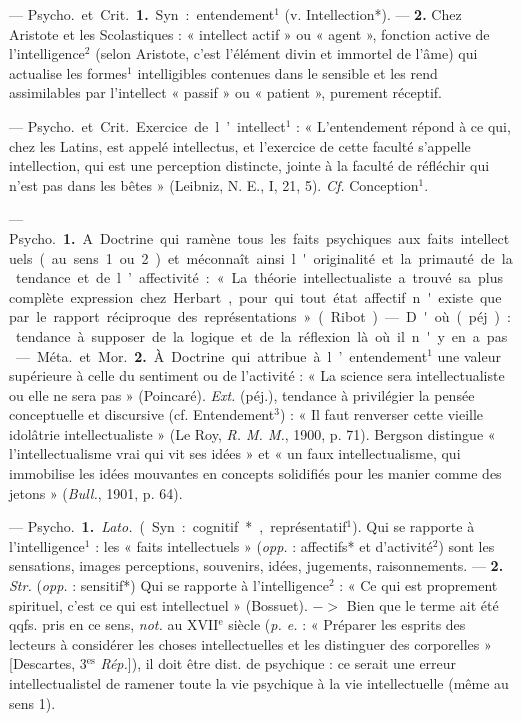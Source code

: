 \begin{itemize}[leftmargin=1cm, label=, itemsep=1pt]
 — \si{Psycho.} et \si{Crit.} {\bf 1.} Syn. :
entendement$^1$ (v. Intellection*). —
 {\bf 2.} Chez Aristote et les Scolastiques :
« intellect actif » ou « agent »,
fonction active de l'intelligence$^2$ (selon Aristote, c’est l'élément divin et
immortel de l’âme) qui actualise les
formes$^1$ intelligibles contenues dans
le sensible et les rend assimilables
par l'intellect « passif » ou « patient », purement réceptif.

 — \si{Psycho.} et \si{Crit.} Exercice de l’intellect$^1$ : « L’entendement
répond à ce qui, chez les Latins,
est appelé intellectus, et l'exercice
de cette faculté s’appelle intellection,
qui est une perception distincte,
jointe à la faculté de réfléchir
qui n’est pas dans les bêtes »
(Leibniz, N. E., I, 21, 5). {\it {\it Cf.}} Conception$^1$.

 — \si{Psycho.} {\bf 1.} A.
Doctrine qui ramène tous les faits
psychiques aux faits intellectuels
(au sens 1 ou 2) et méconnaît ainsi
l'originalité et la primauté de la
tendance et de l’affectivité : « La
théorie intellectualiste a trouvé sa
plus complète expression chez Herbart, pour qui tout état affectif
n'existe que par le rapport réciproque
des représentations » (Ribot).
— D'où (péj.) : tendance à supposer
de la logique et de la réflexion là où
il n'y en a pas.

— \si{Méta.} et \si{Mor.} {\bf 2.} À. Doctrine
qui attribue à l’entendement$^1$ une
valeur supérieure à celle du sentiment ou de l’activité : « La science
sera intellectualiste ou elle ne sera
pas » (Poincaré). {\it Ext.} (péj.), tendance à privilégier la pensée conceptuelle et discursive (cf. Entendement$^3$) : « Il faut renverser cette
vieille idolâtrie intellectualiste »
(Le Roy, {\it R. M. M.}, 1900, p. 71).
Bergson distingue « l’intellectualisme vrai qui vit ses idées » et « un
faux intellectualisme, qui immobilise les idées mouvantes en concepts
solidifiés pour les manier comme
des jetons » ({\it Bull.}, 1901, p. 64).

 — \si{Psycho.} {\bf 1.} {\it Lato.} (Syn. :
cognitif*, représentatif$^1$). Qui se rapporte à l'intelligence$^1$ : les « faits
intellectuels » ({\it opp.} : affectifs* et
d'activité$^2$) sont les sensations, images
perceptions, souvenirs, idées, jugements, raisonnements. — {\bf 2.} {\it Str.}
({\it opp.} : sensitif*) Qui se rapporte à
l'intelligence$^2$ : « Ce qui est proprement spirituel, c’est ce qui est intellectuel » (Bossuet). $->$ Bien que le
terme ait été qqfs. pris en ce sens,
{\it not.} au {\footnotesize XVII}$^\text{e}$ siècle ({\it p. e.} : « Préparer
les esprits des lecteurs à considérer
les choses intellectuelles et les distinguer des corporelles » [Descartes,
3$^\text{es}$ {\it Rép.}]), il doit être dist. de psychique : ce serait une erreur intellectualistel de ramener toute la vie
psychique à la vie intellectuelle
(même au sens 1).


\end{itemize}
